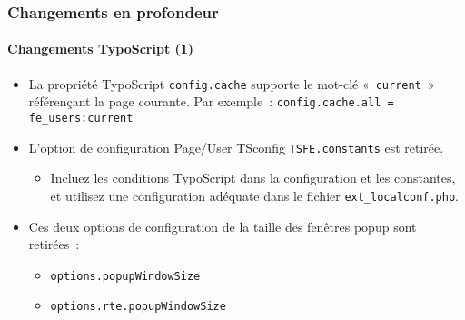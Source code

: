 \begin{frame}[fragile]
	\frametitle{Changements en profondeur}
	\framesubtitle{Changements TypoScript (1)}

	\begin{itemize}
		\item La propriété TypoScript \texttt{config.cache} supporte le mot-clé
			«~\texttt{current}~» référençant la page courante. Par exemple~: \newline
			\smaller\texttt{config.cache.all = fe\_users:current}\normalsize

		\item L'option de configuration Page/User TSconfig \texttt{TSFE.constants} est retirée.

			\begin{itemize}\smaller
				\item[\ding{228}] Incluez les conditions TypoScript dans la configuration et les constantes,
				et utilisez une configuration adéquate dans le fichier \texttt{ext\_localconf.php}.
			\end{itemize}

		\item Ces deux options de configuration de la taille des fenêtres popup sont retirées~:

			\begin{itemize}
				\item \texttt{options.popupWindowSize}
				\item \texttt{options.rte.popupWindowSize}
			\end{itemize}

	\end{itemize}

\end{frame}


